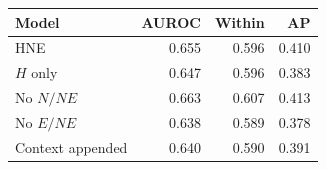 \begin{tabular*}{\linewidth}{@{\extracolsep{\fill}}lrrr@{}}
\toprule
Model & AUROC & Within & AP \\
\midrule
HNE & 0.655 & 0.596 & 0.410 \\
$H$ only & 0.647 & 0.596 & 0.383 \\
No $N/NE$ & 0.663 & 0.607 & 0.413 \\
No $E/NE$ & 0.638 & 0.589 & 0.378 \\
Context appended & 0.640 & 0.590 & 0.391 \\
\bottomrule
\end{tabular*}